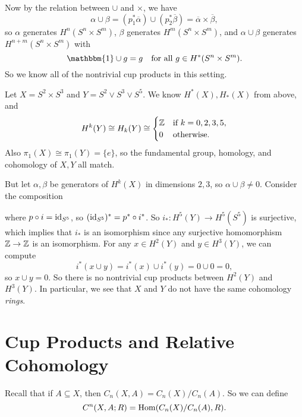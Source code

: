 \begin{example}
  Now by the relation between $\cup$ and
  $\times$, we have
  \[
    \alpha \cup \beta = (p_1^* \overline{\alpha}) \cup (p_2^* \overline{\beta})
    = \overline{\alpha} \times \overline{\beta},
  \]
  so $\alpha$ generates $H^n(S^n \times S^m)$,
  $\beta$ generates $H^m(S^n \times S^m)$, and
  $\alpha \cup \beta$ generates
  $H^{n+m}(S^n \times S^m)$ with
  \[\mathbbm{1} \cup g = g \quad
  \text{for all } g \in H^*(S^n \times S^m).\]
  So we know all of the nontrivial cup products
  in this setting.
\end{example}

\begin{example}
  Let $X = S^2 \times S^3$ and
  $Y = S^2 \lor S^3 \lor S^5$. We know
  $H^*(X), H_*(X)$ from above, and
  \[
    H^k(Y) \cong H_k(Y) \cong
    \begin{cases}
      \mathbb{Z} & \text{if } k = 0, 2, 3, 5, \\
      0 & \text{otherwise}.
    \end{cases}
  \]
  Also $\pi_1(X) \cong \pi_1(Y) = \{e\}$, so
  the fundamental group, homology, and
  cohomology of $X, Y$ all match.

  But let $\alpha, \beta$ be generators of
  $H^k(X)$ in dimensions $2, 3$, so
  $\alpha \cup \beta \ne 0$. Consider the
  composition
  \begin{center}
  \end{center}
  where $p \circ i = \operatorname{id}_{S^5}$, so
  $(\operatorname{id}_{S^5})^* = p^* \circ i^*$.
  So $i_* : H^5(Y) \to H^5(S^5)$ is surjective,
  which implies that $i_*$ is an isomorphism
  since any surjective homomorphism
  $\mathbb{Z} \to \mathbb{Z}$ is an isomorphism.
  For any $x \in H^2(Y)$ and $y \in H^3(Y)$,
  we can compute
  \[
    i^*(x \cup y) = i^*(x) \cup i^*(y) = 0 \cup 0 = 0,
  \]
  so $x \cup y = 0$. So there is no
  nontrivial cup products between
  $H^2(Y)$ and $H^3(Y)$. In particular,
  we see that
  $X$ and $Y$ do not have the same
  cohomology \emph{rings}.
\end{example}

\section{Cup Products and Relative Cohomology}

\begin{definition}
  Recall that if $A \subseteq X$, then
  $C_n(X, A) = C_n(X) / C_n(A)$. So we can
  define
  \[
    C^n(X, A; R) = \operatorname{Hom}(C_n(X) / C_n(A), R).
  \]
\end{definition}

